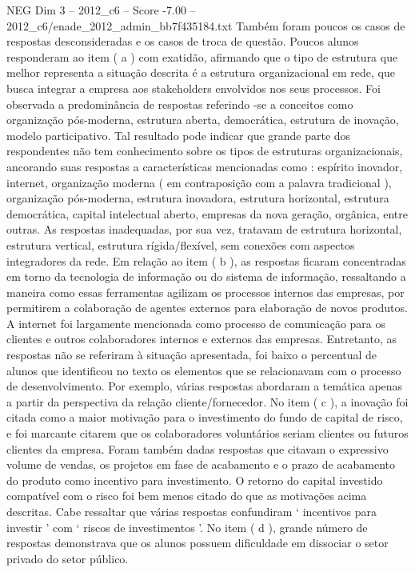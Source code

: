 \begin{textsample}{NEG Dim 3 – 2012\_c6 – Score -7.00 – 2012\_c6/enade\_2012\_admin\_bb7f435184.txt}
Também foram poucos os casos de respostas desconsideradas e os casos de troca de questão.
Poucos alunos responderam ao item ( a ) com exatidão, afirmando que o tipo de estrutura que melhor representa a situação descrita é a estrutura organizacional em rede, que busca integrar a empresa aos stakeholders envolvidos nos seus processos.
Foi observada a predominância de respostas referindo -se a conceitos como organização pós-moderna, estrutura aberta, democrática, estrutura de inovação, modelo participativo.
Tal resultado pode indicar que grande parte dos respondentes não tem conhecimento sobre os tipos de estruturas organizacionais, ancorando suas respostas a características mencionadas como : espírito inovador, internet, organização moderna ( em contraposição com a palavra tradicional ), organização pós-moderna, estrutura inovadora, estrutura horizontal, estrutura democrática, capital intelectual aberto, empresas da nova geração, orgânica, entre outras.
As respostas inadequadas, por sua vez, tratavam de estrutura horizontal, estrutura vertical, estrutura rígida/flexível, sem conexões com aspectos integradores da rede.
Em relação ao item ( b ), as respostas ficaram concentradas em torno da tecnologia de informação ou do sistema de informação, ressaltando a maneira como essas ferramentas agilizam os processos internos das empresas, por permitirem a colaboração de agentes externos para elaboração de novos produtos.
A internet foi largamente mencionada como processo de comunicação para os clientes e outros colaboradores internos e externos das empresas.
Entretanto, as respostas não se referiram à situação apresentada, foi baixo o percentual de alunos que identificou no texto os elementos que se relacionavam com o processo de desenvolvimento.
Por exemplo, várias respostas abordaram a temática apenas a partir da perspectiva da relação cliente/fornecedor.
No item ( c ), a inovação foi citada como a maior motivação para o investimento do fundo de capital de risco, e foi marcante citarem que os colaboradores voluntários seriam clientes ou futuros clientes da empresa.
Foram também dadas respostas que citavam o expressivo volume de vendas, os projetos em fase de acabamento e o prazo de acabamento do produto como incentivo para investimento.
O retorno do capital investido compatível com o risco foi bem menos citado do que as motivações acima descritas.
Cabe ressaltar que várias respostas confundiram ‘ incentivos para investir ’ com ‘ riscos de investimentos ’.
No item ( d ), grande número de respostas demonstrava que os alunos possuem dificuldade em dissociar o setor privado do setor público.

\end{textsample}
